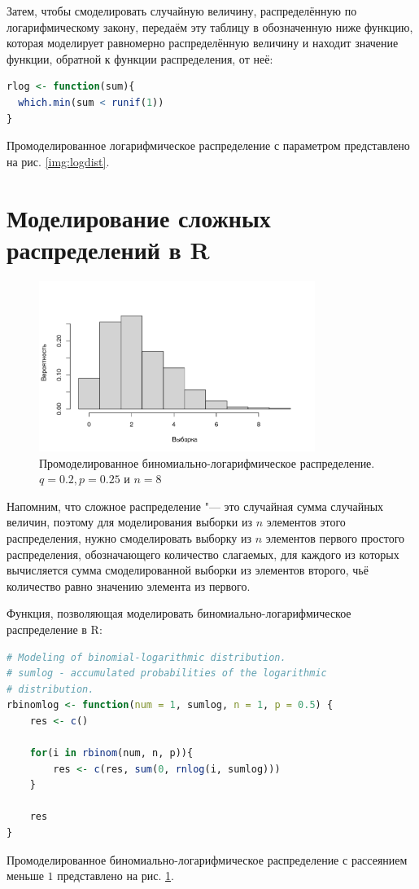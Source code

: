 \documentclass[12pt, specialist, subf, substylefile = spbu.rtx]{disser}
\begin{document}
	Затем, чтобы смоделировать случайную величину, распределённую по логарифмическому закону, передаём эту таблицу в обозначенную ниже функцию, которая моделирует равномерно распределённую величину и находит значение функции, обратной к функции распределения, от неё:
	
	\begin{lstlisting}[language=R]
rlog <- function(sum){
  which.min(sum < runif(1))
}
	\end{lstlisting}	
	
	Промоделированное логарифмическое распределение с параметром представлено на рис. \ref{img:logdist}.
	
	\section{Моделирование сложных распределений в R}
	
	\begin{figure}[ht]
		\centering
		\includegraphics[width = 0.8\textwidth]{binlogsample}
		\caption{Промоделированное биномиально-логарифмическое распределение. $ q = 0.2, p = 0.25 $ и $ n = 8 $}
		\label{img:binlogsample}
	\end{figure}
	
	Напомним, что сложное распределение "--- это случайная сумма случайных величин, поэтому для моделирования выборки из $ n $ элементов этого распределения, нужно смоделировать выборку из $ n $ элементов первого простого распределения, обозначающего количество слагаемых, для каждого из которых вычисляется сумма смоделированной выборки из элементов второго, чьё количество равно значению элемента из первого.
	
	Функция, позволяющая моделировать биномиально-логарифмическое распределение в R:
	\begin{lstlisting}[language=R]
# Modeling of binomial-logarithmic distribution.
# sumlog - accumulated probabilities of the logarithmic
# distribution.
rbinomlog <- function(num = 1, sumlog, n = 1, p = 0.5) {
	res <- c()
	
	for(i in rbinom(num, n, p)){
		res <- c(res, sum(0, rnlog(i, sumlog)))
	}
	
	res
}
	\end{lstlisting}
	\label{page:Rmodel}
	Промоделированное биномиально-логарифмическое распределение с рассеянием меньше $ 1 $ представлено на рис. \ref{img:binlogsample}.
	
\end{document}
